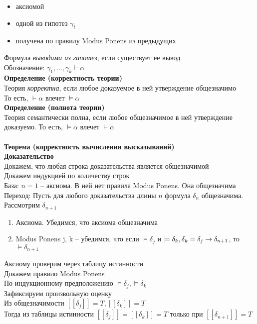\documentclass[12pt]{article}
\begin{document}
\begin{itemize}
    \item аксиомой
    \item одной из гипотез $\gamma_t$
    \item получена по правилу Modus Ponens из предыдущих
\end{itemize}
Формула \textit{выводима из гипотез}, если существует ее вывод\\
Обозначение: $\gamma_1, \ldots, \gamma_k \vdash \alpha$\\
\textbf{Определение (корректность теории)}\\
Теория \textit{корректна}, если любое доказуемое в ней утверждение общезначимо\\
То есть, $\vdash \alpha$ влечет $\models \alpha$\\
\textbf{Определение (полнота теории)}\\
Теория семантически полна, если любое общезначимое в ней утверждение доказуемо. То есть, $\models \alpha$ влечет $\vdash \alpha$\\\\
\textbf{Теорема (корректность вычисления высказываний)}\\
\textbf{Доказательство}\\
Докажем, что любая строка доказательства является общезначимой\\
Докажем индукцией по количеству строк\\
База: $n=1$ -- аксиома. В ней нет правила Modus Ponens. Она общезначима\\ 
Переход: Пусть для любого доказательства длины $n$ формула $\delta_n$ общезначима. Рассмотрим $\delta_{n+1}$
\begin{enumerate}
    \item Аксиома. Убедимся, что аксиома общезначима
    \item Modus Ponens j, k -- убедимся, что если $\models \delta_j$ и $\models \delta_k, \delta_k = \delta_j \rightarrow \delta_{n+1}$, то $\models \delta_{n+1}$
\end{enumerate}
Аксиому проверим через таблицу истинности\\
Докажем правило Modus Ponens\\
По индукционному предположению $\models \delta_j, \models \delta_k$\\
Зафиксируем произвольную оценку\\
Из общезначимости $[[\delta_j]] = T, [[\delta_k]] = T$\\
Тогда из таблицы истинности $[[\delta_j]] = [[\delta_k]] = T$ только при $[[\delta_{n+1}]] = T$\\
\end{document}
